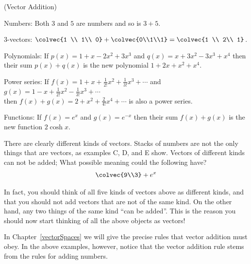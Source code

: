 \begin{example} (Vector Addition)
\begin{enumext}[label=\Alph*,wrap-label=(#1)]
\item Numbers: Both $3$ and $5$ are numbers and so is $3+5$.\\[-2mm]
\item 3-vectors: $\colvec{1 \\ 1\\ 0} + \colvec{0\\1\\1}=\colvec{1 \\ 2\\ 1}$.\\[-1mm]
\item Polynomials: If $p(x)=1+x-2x^2+3x^3$ and $q(x)=x+3x^2-3x^3+x^4$ then\\[1mm] their sum $p(x)+q(x)$ is the new polynomial $1+2x+x^2+x^4$.\\
\item Power series: If $f(x)=1+x+\frac1{2!} x^2 + \frac1{3!} x^3 +\cdots$ and $g(x)=1-x+\frac1{2!} x^2 - \frac1{3!} x^3 +\cdots$ \\[1mm]
 then $f(x)+g(x)=2+ x^2 +\frac2 {4!} x^4+\cdots$ is also a power series.\\
\item Functions: If $f(x)=e^x$ and $g(x)=e^{-x}$ then their sum $f(x)+g(x)$ is the new function $2\cosh x$.
\end{enumext}
\end{example}

\noindent
There are clearly different kinds of vectors. 
Stacks of numbers are not the only things that are vectors, as examples C, D, and E show. 
Vectors of different kinds can not be added; What possible meaning could the following have? 
\[\colvec{9\\3} + e^x\]

In fact, you should think of all five kinds of vectors above as different kinds, and that you should not add vectors that are not of the same kind. 
On the other hand, any two things of the same kind ``can be added''. 
This is the reason you should now start thinking of all the above objects as vectors! 

In Chapter~\ref{vectorSpaces} we will give the precise rules that  vector addition must obey. 
In the above examples, however, notice that the vector addition rule stems from the rules for adding numbers. 
 

